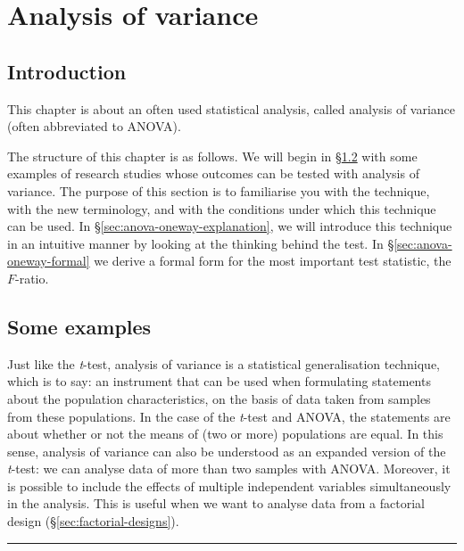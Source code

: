 \documentclass[
]{book}
\begin{document}
\hypertarget{ch:anova}{%
\chapter{Analysis of variance}\label{ch:anova}}

\hypertarget{sec:introduction}{%
\section{Introduction}\label{sec:introduction}}

This chapter is about an often used statistical analysis, called
analysis of variance (often abbreviated to ANOVA).

The structure of this chapter is as follows. We will begin in §\ref{sec:anova-examples}
with some examples of research studies whose outcomes
can be tested with analysis of variance. The purpose of this section
is to familiarise you with the technique,
with the new terminology, and with the conditions under which this technique
can be used. In §\ref{sec:anova-oneway-explanation}, we will introduce this technique
in an intuitive manner by looking at the thinking behind the test. In
§\ref{sec:anova-oneway-formal} we derive a formal form for the most important
test statistic, the \(F\)-ratio.

\hypertarget{sec:anova-examples}{%
\section{Some examples}\label{sec:anova-examples}}

Just like the \emph{t}-test, analysis of variance is a statistical generalisation
technique, which is to say: an instrument that can be used
when formulating statements about the population characteristics,
on the basis of data taken from samples from these populations.
In the case of the \emph{t}-test and ANOVA, the statements are about
whether or not the means of (two or more) populations are equal.
In this sense, analysis of variance can also be understood as an
expanded version of the \emph{t}-test: we can analyse data
of more than two samples with ANOVA. Moreover, it is possible to include the effects
of multiple independent variables simultaneously in the analysis. This is useful
when we want to analyse data from a factorial design
(§\ref{sec:factorial-designs}).

\begin{center}\rule{0.5\linewidth}{0.5pt}\end{center}
\end{document}
